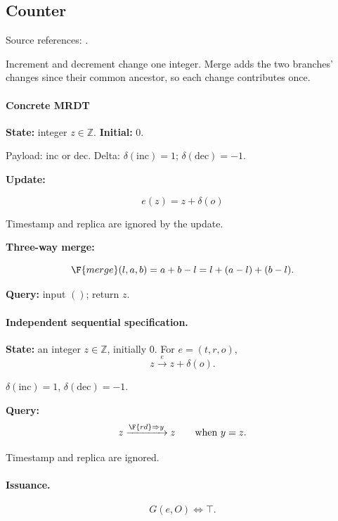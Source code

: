\subsection{Counter}
\label{app:dt-counter}

\noindent Source references: \cite{neem}.





Increment and decrement change one integer. Merge adds the two branches' changes since their common ancestor, so each change contributes once.

\paragraph{Concrete MRDT}
\textbf{State:} integer $z\in\mathbb{Z}$. \textbf{Initial:} $0$.

Payload: inc or dec. Delta: $\delta(\mathrm{inc})=1$; $\delta(\mathrm{dec})=-1$.

\textbf{Update:}

\[
e(z)=z+\delta(o)
\]

Timestamp and replica are ignored by the update.


\textbf{Three-way merge:}

\[
\F{merge}(l,a,b)=a+b-l=l+(a-l)+(b-l).
\]


\textbf{Query:} input $()$; return $z$.

\paragraph{Independent sequential specification.}
\textbf{State:} an integer $z\in\mathbb Z$, initially $0$. For $e=(t,r,o)$,
\[
z\xrightarrow{e}z+\delta(o).
\]

$\delta(\mathrm{inc})=1$, $\delta(\mathrm{dec})=-1$.

\textbf{Query:}
\[
z\xrightarrow{\F{rd}\Rightarrow y}z\qquad\text{when }y=z.
\]

Timestamp and replica are ignored.


\paragraph{Issuance.}
\[
G(e,O)\iff\top.
\]

